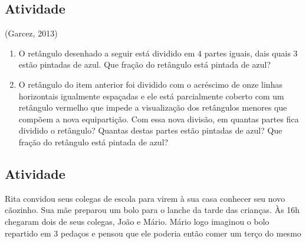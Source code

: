 \subsection{Atividade}

(Garcez, 2013)

\begin{enumerate} [\quad a)] %
  \item     O retângulo desenhado a seguir está dividido em     $4$ partes iguais, dais quais     $3$ estão pintadas de azul. Que fração do retângulo está pintada de azul?
  \begin{center}
\end{center}

\item     O retângulo do item anterior foi dividido com o acréscimo de onze linhas horizontais igualmente espaçadas e ele está parcialmente coberto com um retângulo vermelho que impede a visualização dos retângulos menores que compõem a nova equipartição. Com essa nova divisão, em quantas partes fica dividido o retângulo? Quantas destas partes estão pintadas de azul? Que fração do retângulo está pintada de azul?     \mbox{} \newline
\end{enumerate} %

\begin{center}
\end{center}

\subsection{Atividade}
Rita convidou seus colegas de escola para virem à sua casa conhecer seu novo cãozinho. Sua mãe preparou um bolo para o lanche da tarde das crianças. Às 16h chegaram dois de seus colegas, João e Mário. Mário logo imaginou o bolo repartido em 3 pedaços e pensou que ele poderia então comer um terço do mesmo

